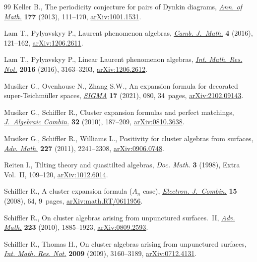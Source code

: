 \documentclass[pdftex]{sigma}
\numberwithin{equation}{section}
\begin{document}
\begin{thebibliography}{99}
Keller B., The periodicity conjecture for pairs of {D}ynkin diagrams,
 \href{https://doi.org/10.4007/annals.2013.177.1.3}{\textit{Ann. of Math.}} \textbf{177} (2013), 111--170, \href{https://arxiv.org/abs/1001.1531}{arXiv:1001.1531}.

Lam T., Pylyavskyy P., Laurent phenomenon algebras, \href{https://doi.org/10.4310/CJM.2016.v4.n1.a2}{\textit{Camb. J.~Math.}}
 \textbf{4} (2016), 121--162, \href{https://arxiv.org/abs/1206.2611}{arXiv:1206.2611}.

Lam T., Pylyavskyy P., Linear {L}aurent phenomenon algebras, \href{https://doi.org/10.1093/imrn/rnv237}{\textit{Int. Math.
 Res. Not.}} \textbf{2016} (2016), 3163--3203, \href{https://arxiv.org/abs/1206.2612}{arXiv:1206.2612}.

Musiker G., Ovenhouse N., Zhang S.W., An expansion formula for decorated
 super-{T}eichm\"uller spaces, \href{https://doi.org/10.3842/SIGMA.2021.080}{\textit{SIGMA}} \textbf{17} (2021), 080,
 34~pages, \href{https://arxiv.org/abs/2102.09143}{arXiv:2102.09143}.

Musiker G., Schiffler R., Cluster expansion formulas and perfect matchings,
 \href{https://doi.org/10.1007/s10801-009-0210-3}{\textit{J.~Algebraic Combin.}} \textbf{32} (2010), 187--209,
 \href{https://arxiv.org/abs/0810.3638}{arXiv:0810.3638}.

Musiker G., Schiffler R., Williams L., Positivity for cluster algebras from
 surfaces, \href{https://doi.org/10.1016/j.aim.2011.04.018}{\textit{Adv. Math.}} \textbf{227} (2011), 2241--2308,
 \href{https://arxiv.org/abs/0906.0748}{arXiv:0906.0748}.

Reiten I., Tilting theory and quasitilted algebras, \textit{Doc. Math.}
 \textbf{3} (1998), Extra Vol.~II, 109--120, \href{https://arxiv.org/abs/1012.6014}{arXiv:1012.6014}.

Schiffler R., A cluster expansion formula ({$A_n$} case), \href{https://doi.org/10.37236/788}{\textit{Electron.
 J.~Combin.}} \textbf{15} (2008), 64, 9~pages, \href{https://arxiv.org/abs/math.RT/0611956}{arXiv:math.RT/0611956}.

Schiffler R., On cluster algebras arising from unpunctured surfaces.~{II},
 \href{https://doi.org/10.1016/j.aim.2009.10.015}{\textit{Adv. Math.}} \textbf{223} (2010), 1885--1923, \href{https://arxiv.org/abs/0809.2593}{arXiv:0809.2593}.

Schiffler R., Thomas H., On cluster algebras arising from unpunctured surfaces,
 \href{https://doi.org/10.1093/imrn/rnp047}{\textit{Int. Math. Res. Not.}} \textbf{2009} (2009), 3160--3189,
 \href{https://arxiv.org/abs/0712.4131}{arXiv:0712.4131}.

\end{thebibliography}\LastPageEnding
\end{document}
